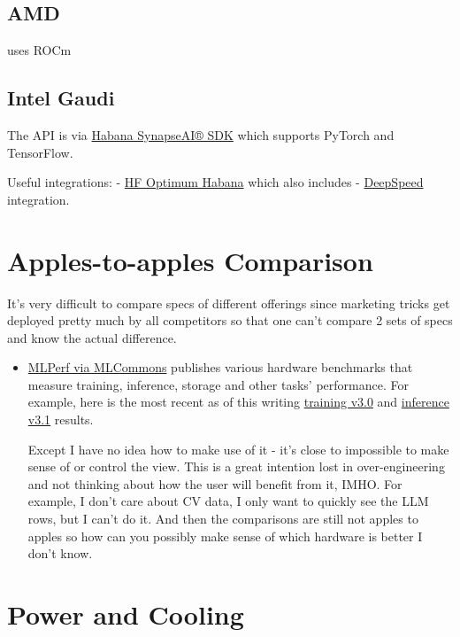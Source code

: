 \documentclass[
]{report}
\begin{document}
\subsection{AMD}\label{amd-1}

uses ROCm

\subsection{Intel Gaudi}\label{intel-gaudi}

The API is via \href{https://habana.ai/training-software/}{Habana
SynapseAI® SDK} which supports PyTorch and TensorFlow.

Useful integrations: -
\href{https://github.com/huggingface/optimum-habana}{HF Optimum Habana}
which also includes -
\href{https://github.com/microsoft/DeepSpeed}{DeepSpeed} integration.

\section{Apples-to-apples Comparison}\label{apples-to-apples-comparison}

It's very difficult to compare specs of different offerings since
marketing tricks get deployed pretty much by all competitors so that one
can't compare 2 sets of specs and know the actual difference.

\begin{itemize}
\item
  \href{https://mlcommons.org/en/}{MLPerf via MLCommons} publishes
  various hardware benchmarks that measure training, inference, storage
  and other tasks' performance. For example, here is the most recent as
  of this writing
  \href{https://mlcommons.org/en/training-normal-30/}{training v3.0} and
  \href{https://mlcommons.org/en/inference-datacenter-31/}{inference
  v3.1} results.

  Except I have no idea how to make use of it - it's close to impossible
  to make sense of or control the view. This is a great intention lost
  in over-engineering and not thinking about how the user will benefit
  from it, IMHO. For example, I don't care about CV data, I only want to
  quickly see the LLM rows, but I can't do it. And then the comparisons
  are still not apples to apples so how can you possibly make sense of
  which hardware is better I don't know.
\end{itemize}

\section{Power and Cooling}\label{power-and-cooling}
\end{document}
